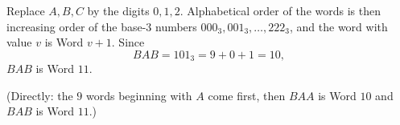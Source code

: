 Replace $A,B,C$ by the digits $0,1,2$. Alphabetical order of the words is then increasing order of the base-$3$ numbers $000_3,001_3,\dots,222_3$, and the word with value $v$ is Word $v+1$. Since
\[
BAB=101_3=9+0+1=10,
\]
$BAB$ is Word $\boxed{11}$.

(Directly: the $9$ words beginning with $A$ come first, then $BAA$ is Word $10$ and $BAB$ is Word $11$.)

